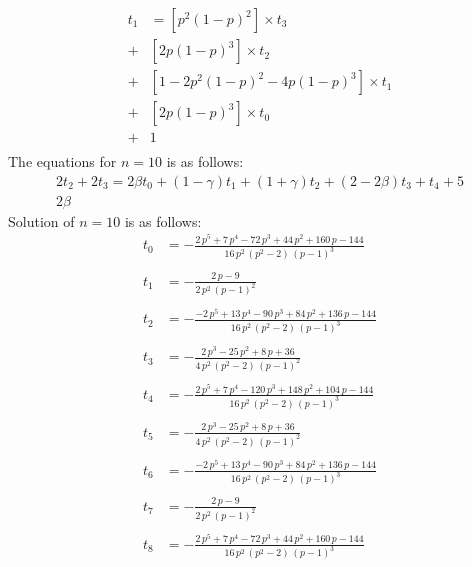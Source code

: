 \documentclass[]{book}
\theoremstyle{definition}
\begin{document}
\begin{equation}
\begin{split}
    t_1 &= \left[ p^2(1-p)^2 \right] \times t_3 \\
    +& \left[ 2p(1-p)^3 \right] \times t_2 \\
    +& \left[ 1 - 2p^2(1-p)^2 - 4p(1-p)^3 \right] \times t_1 \\ 
    +& \left[ 2p(1-p)^3 \right] \times t_0 \\
    +& 1 \\
\end{split}
\end{equation}
The equations for $n=10$ is as follows:
\begin{equation}
\begin{split}
2t_2+2t_3=2\beta t_0 + (1-\gamma)t_1 + (1+\gamma)t_2 +
(2-2\beta)t_3 +
t_4 +
5 \\
2\beta
\end{split}
\end{equation}
Solution of $n=10$ is as follows:
\begin{equation}
\begin{split}
    t_0 &= -\frac{2\,p^5+7\,p^4-72\,p^3+44\,p^2+160\,p-144}{16\,p^2\,\left(p^2-2\right)\,{\left(p-1\right)}^3} \\ \\
    t_1 &= -\frac{2\,p-9}{2\,p^2\,{\left(p-1\right)}^2} \\ \\
    t_2 &= -\frac{-2\,p^5+13\,p^4-90\,p^3+84\,p^2+136\,p-144}{16\,p^2\,\left(p^2-2\right)\,{\left(p-1\right)}^3} \\ \\
    t_3 &= -\frac{2\,p^3-25\,p^2+8\,p+36}{4\,p^2\,\left(p^2-2\right)\,{\left(p-1\right)}^2} \\ \\
    t_4 &= -\frac{2\,p^5+7\,p^4-120\,p^3+148\,p^2+104\,p-144}{16\,p^2\,\left(p^2-2\right)\,{\left(p-1\right)}^3} \\ \\
    t_5 &= -\frac{2\,p^3-25\,p^2+8\,p+36}{4\,p^2\,\left(p^2-2\right)\,{\left(p-1\right)}^2} \\ \\
    t_6 &= -\frac{-2\,p^5+13\,p^4-90\,p^3+84\,p^2+136\,p-144}{16\,p^2\,\left(p^2-2\right)\,{\left(p-1\right)}^3} \\ \\
    t_7 &= -\frac{2\,p-9}{2\,p^2\,{\left(p-1\right)}^2} \\ \\
    t_8 &= -\frac{2\,p^5+7\,p^4-72\,p^3+44\,p^2+160\,p-144}{16\,p^2\,\left(p^2-2\right)\,{\left(p-1\right)}^3} \\ \\
\end{split}
\end{equation}
\end{document}
